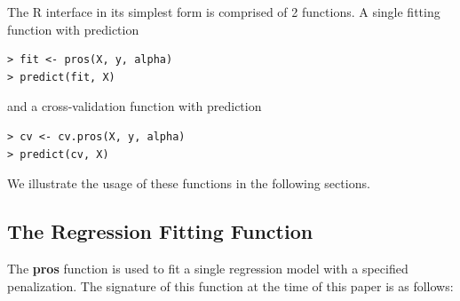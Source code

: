 \documentclass[article]{jss}
\numberwithin{equation}{section}
\begin{document}
The R interface in its simplest form is comprised of 2 functions.
A single fitting function with prediction

\begin{verbatim}
> fit <- pros(X, y, alpha)
> predict(fit, X)
\end{verbatim}

and a cross-validation function with prediction

\begin{verbatim}
> cv <- cv.pros(X, y, alpha)
> predict(cv, X)
\end{verbatim}

We illustrate the usage of these functions in the following sections.

\subsection{The Regression Fitting Function}

The \textbf{pros} function is used to fit a single regression model with a specified penalization. The signature of this function at the time of this paper is as follows:
\end{document}
